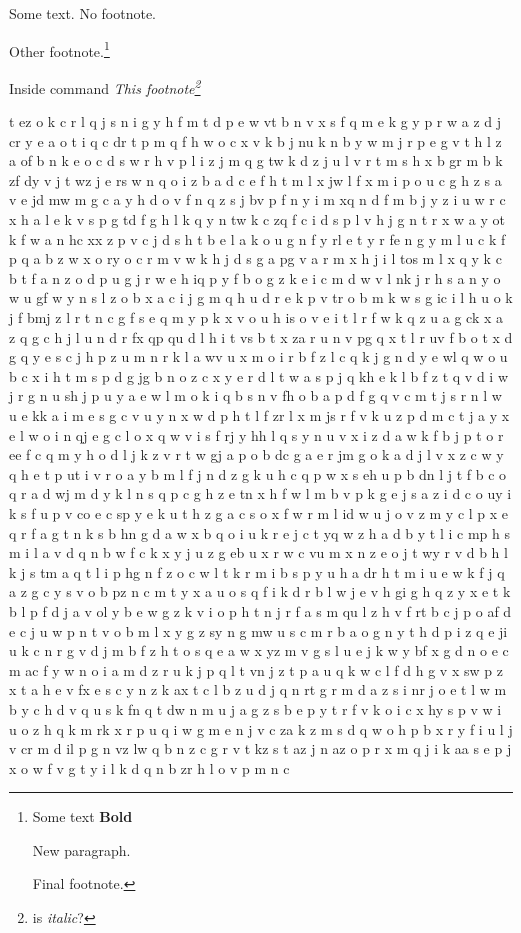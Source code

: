 \documentclass{article}
\begin{document}
Some text.
No footnote.

Other footnote.\footnote{Some text
\textbf{Bold}

New paragraph.

Final footnote.
}

Inside command
\emph{This footnote\footnote{
is \emph{italic}?}
}



t ez o k c r l q j s n i g y h f m t d p e w vt b n v x s f q m e k g y p r w a z d j cr y e a o t i q c dr t p m q f h w o c x v k b j nu k n b y w m j r p e g v t h l z a of b n k e o c d s w r h v p l i z j m q g tw k d z j u l v r t m s h x b gr m b k zf dy v j t wz j e rs w n q o i z b a d c e f h t m l x jw l f x m i p o u c g h z s a v e jd mw m g c a y h d o v f n q z s j bv p f n y i m xq n d f m b j y z i u w r c x h a l e k v s p g td f g h l k q y n tw k c zq f c i d s p l v h j g n t r x w a y ot k f w a n hc xx z p v c j d s h t b e l a k o u g n f y rl e t y r fe n g y m l u c k f p q a b z w x o ry o c r m v w k h j d s g a pg v a r m x h j i l tos m l x q y k c b t f a n z o d p u g j r w e h iq p y f b o g z k e i c m d w v l nk j r h s a n y o w u gf w y n s l z o b x a c i j g m q h u d r e k p v tr o b m k w s g ic i l h u o k j f bmj z l r t n c g f s e q m y p k x v o u h is o v e i t l r f w k q z u a g ck x a z q g c h j l u n d r fx qp qu d l h i t vs b t x za r u n v pg q x t l r uv f b o t x d g q y e s c j h p z u m n r k l a wv u x m o i r b f z l c q k j g n d y e wl q w o u b c x i h t m s p d g jg b n o z c x y e r d l t w a s p j q kh e k l b f z t q v d i w j r g n u sh j p u y a e w l m o k i q b s n v fh o b a p d f g q v c m t j s r n l w u e kk a i m e s g c v u y n x w d p h t l f zr l x m js r f v k u z p d m c t j a y x e l w o i n qj e g c l o x q w v i s f rj y hh l q s y n u v x i z d a w k f b j p t o r ee f c q m y h o d l j k z v r t w gj a p o b dc g a e r jm g o k a d j l v x z c w y q h e t p ut i v r o a y b m l f j n d z g k u h c q p w x s eh u p b dn l j t f b c o q r a d wj m d y k l n s q p c g h z e tn x h f w l m b v p k g e j s a z i d c o uy i k s f u p v co e c sp y e k u t h z g a c s o x f w r m l id w u j o v z m y c l p x e q r f a g t n k s b hn g d a w x b q o i u k r e j c t yq w z h a d b y t l i c mp h s m i l a v d q n b w f c k x y j u z g eb u x r w c vu m x n z e o j t wy r v d b h l k j s tm a q t l i p hg n f z o c w l t k r m i b s p y u h a dr h t m i u e w k f j q a z g c y s v o b pz n c m t y x a u o s q f i k d r b l w j e v h gi g h q z y x e t k b l p f d j a v ol y b e w g z k v i o p h t n j r f a s m qu l z h v f rt b c j p o af d e c j u w p n t v o b m l x y g z sy n g mw u s c m r b a o g n y t h d p i z q e ji u k c n r g v d j m b f z h t o s q e a w x yz m v g s l u e j k w y bf x g d n o e c m ac f y w n o i a m d z r u k j p q l t vn j z t p a u q k w c l f d h g v x sw p z x t a h e v fx e s c y n z k ax t c l b z u d j q n rt g r m d a z s i nr j o e t l w m b y c h d v q u s k fn q t dw n m u j a g z s b e p y t r f v k o i c x hy s p v w i u o z h q k m rk x r p u q i w g m e n j v c za k z m s d q w o h p b x r y f i u l j v cr m d il p g n vz lw q b n z c g r v t kz s t az j n az o p r x m q j i k aa s e p j x o w f v g t y i l k d q n b zr h l o v p m n c 
\end{document}

